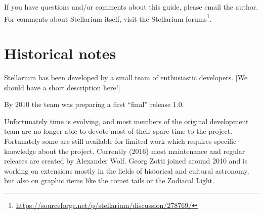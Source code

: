 If you have questions and/or comments about this guide, please email the
author. For comments about Stellarium itself, visit the Stellarium forums\footnote{%
\url{https://sourceforge.net/p/stellarium/discussion/278769/}}.


\section{Historical notes}
\label{sec:Introduction:HistoricalNotes}



Stellarium has been developed by a small team of enthusiastic developers. 
[We should have a short description here!]



By 2010 the team was preparing a first ``final'' release 1.0. 

Unfortunately time is evolving, and most members of the original
development team are no longer able to devote most of their spare time
to the project. Fortunately some are still available for limited work
which requires specific knowledge about the project. Currently (2016)
most maintenance and regular releases are created by Alexander
Wolf. Georg Zotti joined around 2010 and is working on extensions
mostly in the fields of historical and cultural astronomy, but also on
graphic items like the comet tails or the Zodiacal Light.

